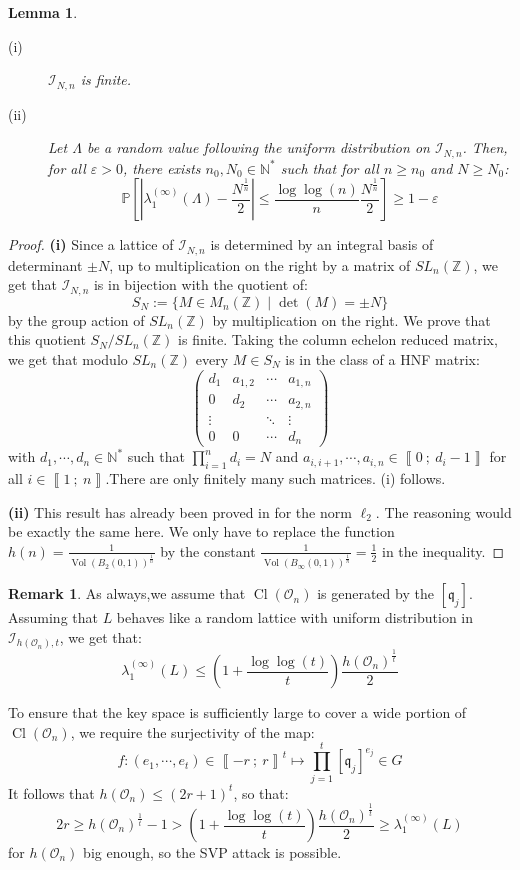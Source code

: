 \documentclass[a4paper,10pt]{report}
\theoremstyle{definition}
\theoremstyle{plain}
\newtheorem{lemma}[definition]{Lemma}
\theoremstyle{definition}
\newtheorem{remark}[definition]{Remark}
\newcommand{\N}{\mathbb{N}}
\newcommand{\Z}{\mathbb{Z}}
\newcommand{\m}[1]{\mathcal{#1}}
\newcommand{\mO}{\mathcal{O}}
\renewcommand{\i}[2]{\left\llbracket #1~;~#2\right\rrbracket}
\renewcommand{\(}{\left(}
\renewcommand{\)}{\right)}
\renewcommand{\P}{\mathbb{P}}
\newcommand{\mf}[1]{\mathfrak{#1}}
\DeclareMathOperator{\Cl}{Cl}
\DeclareMathOperator{\Vol}{Vol}
\begin{document}
\begin{lemma}\label{lemma 22}
\begin{description}
\item[(i)] $\m{I}_{N,n}$ is finite.
\item[(ii)] Let $\Lambda$ be a random value following the uniform distribution on $\m{I}_{N,n}$. Then, for all $\varepsilon>0$, there exists $n_0, N_0\in\N^*$ such that for all $n\geq n_0$ and $N\geq N_0$:
\[\P\left[\left|\lambda_1^{(\infty)}(\Lambda)-\frac{N^{\frac{1}{n}}}{2}\right|\leq \frac{\log\log(n)}{n}\frac{N^{\frac{1}{n}}}{2}\right]\geq 1-\varepsilon\]
\end{description}
\end{lemma}

\begin{proof}
\textbf{(i)} Since a lattice of $\m{I}_{N,n}$ is determined by an integral basis of determinant $\pm N$, up to multiplication on the right by a matrix of $SL_n(\Z)$, we get that $\m{I}_{N,n}$ is in bijection with the quotient of:
\[S_N:=\{M\in M_n(\Z)\mid \det(M)=\pm N\}\]
by the group action of $SL_n(\Z)$ by multiplication on the right.  We prove that this quotient $S_N/SL_n(\Z)$ is finite. Taking the column echelon reduced matrix, we get that modulo $SL_n(\Z)$ every $M\in S_N$ is in the class of a HNF matrix:
\[\(\begin{array}{cccc}
d_1 & a_{1,2} & \cdots & a_{1,n}\\
0 & d_2 & \cdots & a_{2,n}\\
\vdots &  & \ddots & \vdots\\
0 & 0 & \cdots & d_n
\end{array}\)\]
with $d_1, \cdots, d_n\in\N^*$ such that $\prod_{i=1}^n d_i=N$ and $a_{i,i+1}, \cdots, a_{i,n}\in\i{0}{d_i-1}$ for all $i\in\i{1}{n}$.There are only finitely many such matrices. (i) follows.

\textbf{(ii)} This result has already been proved in \cite[theorem 11]{Aono} for the norm $\ell_2$. The reasoning would be exactly the same here. We only have to replace the function $h(n)=\frac{1}{\Vol(B_2(0,1))^{\frac{1}{n}}}$ by the constant $\frac{1}{\Vol(B_\infty(0,1))^{\frac{1}{n}}}=\frac{1}{2}$ in the inequality.
\end{proof}

\begin{remark}\label{remark 4}
As always,we assume that $\Cl(\mO_n)$ is generated by the $[\mf{q}_j]$. Assuming that $L$ behaves like a random lattice with uniform distribution in $\m{I}_{h(\mO_n),t}$, we get that:
\[\lambda_1^{(\infty)}(L)\leq \(1+\frac{\log\log(t)}{t}\)\frac{h(\mO_n)^{\frac{1}{t}}}{2}\] 

To ensure that the key space is sufficiently large to cover a wide portion of $\Cl(\mO_n)$, we require the surjectivity of the map:
\[f:(e_1,\cdots, e_t)\in\i{-r}{r}^t\longmapsto \prod_{j=1}^t[\mf{q}_j]^{e_j}\in G\]
It follows that $h(\mO_n)\leq (2r+1)^t$, so that:
\[2r\geq h(\mO_n)^{\frac{1}{t}}-1>\(1+\frac{\log\log(t)}{t}\)\frac{h(\mO_n)^{\frac{1}{t}}}{2}\geq \lambda_1^{(\infty)}(L)\]
for $h(\mO_n)$ big enough, so the SVP attack is possible.
\end{remark}
\end{document}
